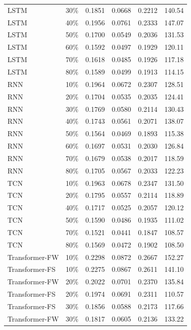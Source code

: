 \begin{longtable}{l c c c c c}
        LSTM & 30\% & 0.1851 & 0.0668 & 0.2212 & 140.54 \\
        LSTM & 40\% & 0.1956 & 0.0761 & 0.2333 & 147.07 \\
        LSTM & 50\% & 0.1700 & 0.0549 & 0.2036 & 131.53 \\
        LSTM & 60\% & 0.1592 & 0.0497 & 0.1929 & 120.11 \\
        LSTM & 70\% & 0.1618 & 0.0485 & 0.1926 & 117.18 \\
        LSTM & 80\% & 0.1589 & 0.0499 & 0.1913 & 114.15 \\
        RNN & 10\% & 0.1964 & 0.0672 & 0.2307 & 128.51 \\
        RNN & 20\% & 0.1704 & 0.0535 & 0.2035 & 124.41 \\
        RNN & 30\% & 0.1769 & 0.0580 & 0.2114 & 130.43 \\
        RNN & 40\% & 0.1743 & 0.0561 & 0.2071 & 138.07 \\
        RNN & 50\% & 0.1564 & 0.0469 & 0.1893 & 115.38 \\
        RNN & 60\% & 0.1697 & 0.0531 & 0.2030 & 126.84 \\
        RNN & 70\% & 0.1679 & 0.0538 & 0.2017 & 118.59 \\
        RNN & 80\% & 0.1705 & 0.0567 & 0.2033 & 122.23 \\
        TCN & 10\% & 0.1963 & 0.0678 & 0.2347 & 131.50 \\
        TCN & 20\% & 0.1795 & 0.0557 & 0.2114 & 118.89 \\
        TCN & 40\% & 0.1717 & 0.0525 & 0.2057 & 120.12 \\
        TCN & 50\% & 0.1590 & 0.0486 & 0.1935 & 111.02 \\
        TCN & 70\% & 0.1521 & 0.0441 & 0.1847 & 108.57 \\
        TCN & 80\% & 0.1569 & 0.0472 & 0.1902 & 108.50 \\
        Transformer-FW & 10\% & 0.2298 & 0.0872 & 0.2667 & 152.27 \\
        Transformer-FS & 10\% & 0.2275 & 0.0867 & 0.2611 & 141.10 \\
        Transformer-FW & 20\% & 0.2022 & 0.0701 & 0.2370 & 135.84 \\
        Transformer-FS & 20\% & 0.1974 & 0.0691 & 0.2311 & 110.57 \\
        Transformer-FS & 30\% & 0.1856 & 0.0588 & 0.2173 & 117.66 \\
        Transformer-FW & 30\% & 0.1817 & 0.0605 & 0.2136 & 133.22 \\

\end{longtable}
